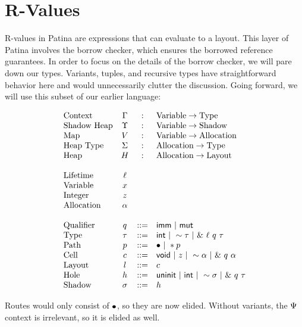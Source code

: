 \section*{R-Values}

R-values in Patina are expressions that can evaluate to a layout.
This layer of Patina involves the borrow checker, which ensures the borrowed reference guarantees.
In order to focus on the details of the borrow checker, we will pare down our types.
Variants, tuples, and recursive types have straightforward behavior here 
and would unnecessarily clutter the discussion.
Going forward, we will use this subset of our earlier language:

\[
\begin{array}{lccl}
\textrm{Context}  & \Gamma & : & \textrm{Variable} \rightarrow \textrm{Type} \\
\textrm{Shadow Heap} & \Upsilon & : & \textrm{Variable} \rightarrow \textrm{Shadow} \\
\textrm{Map} & V   & : & \textrm{Variable} \rightarrow \textrm{Allocation} \\
\textrm{Heap Type} & \Sigma & : & \textrm{Allocation} \rightarrow \textrm{Type} \\
\textrm{Heap} & H   & : & \textrm{Allocation} \rightarrow \textrm{Layout} \\
& & & \\
\textrm{Lifetime} & \ell & & \\
\textrm{Variable} & x & & \\
\textrm{Integer} & z & & \\
\textrm{Allocation} & \alpha & & \\
& & & \\
\textrm{Qualifier} & q & ::= & \mathsf{imm} ~|~ \mathsf{mut} \\
\textrm{Type} & \tau & ::= & \mathsf{int} ~|~ \sim{\tau} ~|~ \&~{{\ell}~{q}~{\tau}} \\
\textrm{Path} & p & ::= & \bullet ~|~ *{p} \\
\textrm{Cell} & c & ::= & \mathsf{void} ~|~ z ~|~ \sim{\alpha} ~|~ \&~{{q}~{\alpha}} \\
\textrm{Layout} & l & ::= & c \\
\textrm{Hole} & h & ::= & \mathsf{uninit} ~|~ \mathsf{int} ~|~ \sim{\sigma} ~|~ \&~{{q}~{\tau}} \\
\textrm{Shadow} & \sigma & ::= & h \\
\end{array}
\]

Routes would only consist of $\bullet$, so they are now elided.
Without variants, the $\Psi$ context is irrelevant, so it is elided as well.

